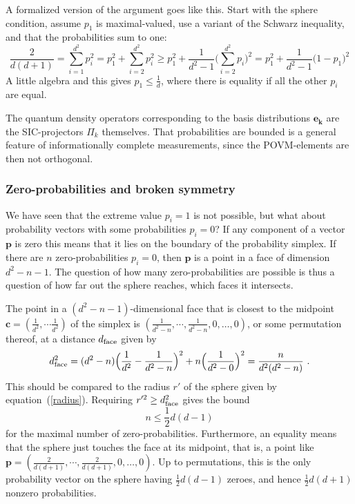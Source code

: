 \documentclass[letterpaper,11pt]{article}
\begin{document}
A formalized version of the argument goes like this. Start with the sphere condition, assume $p_1$ is maximal-valued, use a variant of the Schwarz inequality, and that the probabilities sum to one:
%
\begin{equation}
  {\textstyle \frac{2}{d(d+1)}} = \sum_{i=1}^{d^2} p_i^2 = p_1^2 +  \sum_{i=2}^{d^2} p_i^2 \geq
    p_1^2 + {\textstyle  \frac{1}{d^2-1}}\Big(\sum_{i=2}^{d^2} p_i\Big)^2 =
    p_1^2 + {\textstyle \frac{1}{d^2-1}}\big(1-p_1\big)^2
\end{equation}
%
A little algebra and this gives $p_1\leq\frac{1}{d}$, where there is equality if all the other $p_i$ are equal.

The quantum density operators corresponding to the basis distributions $\mathbf{e_k}$ are the SIC-projectors $\Pi_k$ themselves. That probabilities are bounded is a general feature of informationally complete measurements, since the POVM-elements are then not orthogonal.


\subsubsection{Zero-probabilities and broken symmetry} %

\indent \indent
We have seen that the extreme value $p_i=1$ is not possible, but what about probability vectors with some probabilities $p_i=0$? If any component of a vector $\mathbf p$ is zero this means that it lies on the boundary of the probability simplex. If there are $n$ zero-probabilities $p_i=0$, then $\mathbf p$ is a point in a face of dimension $d^2-n-1$. The question of how many zero-probabilities are possible is thus a question of how far out the sphere reaches, which faces it intersects.

The point in a  $(d^2-n-1)$-dimensional face that is closest to the midpoint $\mathbf c=(\frac{1}{d^2},\cdots\frac{1}{d^2})$ of the simplex is $(\frac{1}{d^2-n},\cdots,\frac{1}{d^2-n},0,\dots,0)$, or some permutation thereof, at a distance $d_\textrm{\scriptsize face}$ given by
\begin{displaymath}
  d_\textrm{\scriptsize face}^2 =
  (d^2-n)\Big(\frac{1}{d^2}-\frac{1}{d^2-n}\Big)^2+n\Big(\frac{1}{d^2-0}\Big)^2=\frac{n}{d^2(d^2-n)} \ .
\end{displaymath}
%
This should be compared to the radius $r'$ of the sphere given by equation~(\ref{radius}). Requiring $r'^2\geq d_\textrm{\scriptsize  face}^2$ gives the bound
%
\begin{equation} \label{zeroesbound}
  n\leq \frac{1}{2}d(d-1)
\end{equation}
%
for the maximal number of zero-probabilities. Furthermore, an equality means that the sphere just touches the face at its midpoint, that is, a point like $\mathbf p=(\frac{2}{d(d+1)},\cdots,\frac{2}{d(d+1)},0,\dots,0)$. Up to permutations, this is the only probability vector on the sphere having $\frac{1}{2}d(d-1)$ zeroes, and hence $\frac{1}{2}d(d+1)$ nonzero probabilities.
\end{document}

